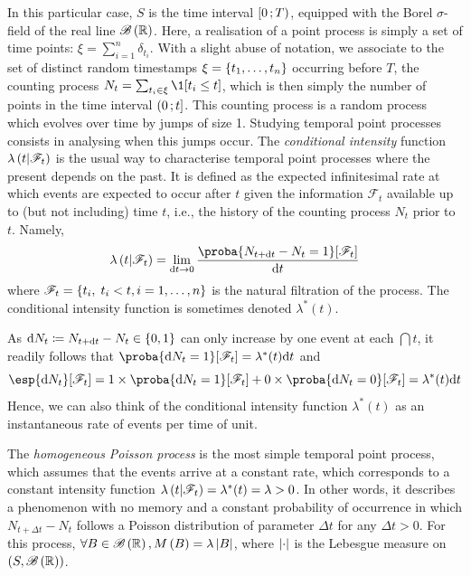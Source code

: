 In this particular case, $S$ is the time interval $\left[ 0 \, ; T \right)$, equipped with the Borel $\sigma$-field of the real line $\mathscr{B}\left( \mathbb{R} \right)$.
Here, a realisation of a point process is simply a set of time points: $\xi = \sum_{i=1}^n \delta_{t_i}$.
With a slight abuse of notation, we associate to the set of distinct random timestamps $\xi = \left\lbrace t_1, \dots, t_n \right\rbrace$ occurring before $T$, the counting process $N_t = \sum_{t_i \in\xi}\1[t_i \leq t]$, which is then simply the number of points in the time interval $\left( 0 \, ; t \right]$.
This counting process is a random process which evolves over time by jumps of size 1.
Studying temporal point processes consists in analysing when this jumps occur.
The \textit{conditional intensity} function $\lambda\left( t \middle| \mathscr{F}_t \right)$ is the usual way to characterise temporal point processes where the present depends on the past.
It is defined as the expected infinitesimal rate at which events are expected to occur after $t$ given the information $\mathscr{F}_t$ available up to (but not including) time $t$, i.e., the history of the counting process $N_t$ prior to $t$.
Namely,
\begin{equation}
    \lambda\pars{t \middle| \mathscr{F}_t} = \lim_{\dint t \to 0} \frac{\proba{N_{t + \dint t} - N_t = 1}[\mathscr{F}_t]}{\dint t}
\end{equation}
where $\mathscr{F}_t = \left\lbrace t_i,\; t_i < t, i=1,\dots,n \right\rbrace$ is the natural filtration of the process.
The conditional intensity function is sometimes denoted $\lambda^*(t)$.

As $\mathrm{d} N_t \coloneqq N_{t +\mathrm{d} t} - N_t \in \left\lbrace 0,1 \right\rbrace$ can only increase by one event at each $\dint t$, it readily follows that $\proba{\dint N_t = 1}[\mathscr{F}_t] = \lambda^*(t)\dint t$ and
\begin{equation}
    \esp{\dint N_t}[\mathscr{F}_t] = 1\times \proba{\dint N_t = 1}[\mathscr{F}_t] + 0\times \proba{\dint N_t = 0}[\mathscr{F}_t] = \lambda^*(t)\dint t
\end{equation}
Hence, we can also think of the conditional intensity function $\lambda^*(t)$ as an instantaneous rate of events per time of unit.

The \textit{homogeneous Poisson process} is the most simple temporal point process, which assumes that the events arrive at a constant rate, which corresponds to a constant intensity function $\lambda\left( t \middle| \mathscr{F}_t \right) = \lambda^*(t) = \lambda > 0$.
In other words, it describes a phenomenon with no memory and a constant probability of occurrence in which $N_{t + \Delta t} - N_t$ follows a Poisson distribution of parameter $\Delta t$ for any $\Delta t > 0$.
For this process, $\forall B \in \mathscr{B}\left( \mathbb{R} \right), M\left( B \right) = \lambda \left\vert B\right\vert$, where $\left\vert \cdot\right\vert$ is the Lebesgue measure on $\left( S, \mathscr{B}\left( \mathbb{R} \right) \right)$.

